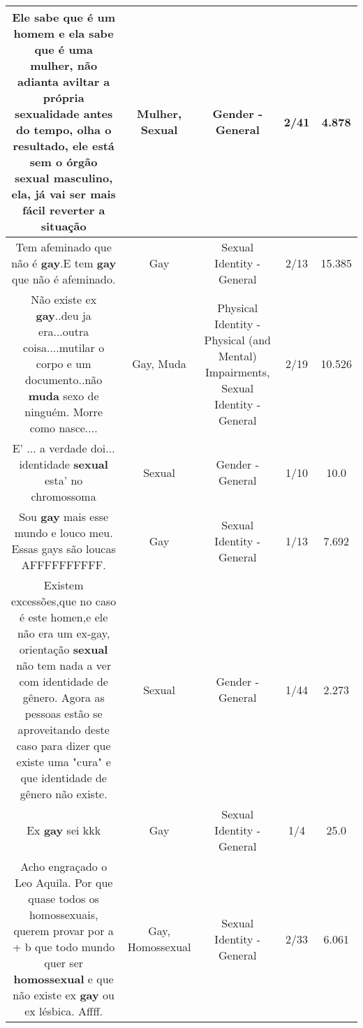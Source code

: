 \documentclass[11pt]{article}
\newlength\mylength
\begin{document}
\begin{center}
\begin{longtable}{|C{.65\mylength}|C{.30\mylength}|C{.12\mylength}|C{.12\mylength}|C{.12\mylength}|}
  \small Ele sabe que é um homem e ela sabe que é uma \textbf{mulher},  não adianta aviltar a própria sexualidade antes do tempo, olha o resultado,  ele está sem o órgão \textbf{sexual} masculino, ela, já vai ser mais fácil reverter a situação\normalsize   & Mulher, Sexual & Gender - General & 2/41 & 4.878 \\  \hline
  \small Tem afeminado que não é \textbf{gay}.E tem \textbf{gay} que não é afeminado.\normalsize   & Gay & Sexual Identity - General & 2/13 & 15.385 \\  \hline
  \small Não existe ex \textbf{gay}..deu ja era...outra coisa....mutilar o corpo e um documento..não \textbf{muda} sexo de ninguém. Morre como nasce....\normalsize   & Gay, Muda & Physical Identity - Physical (and Mental) Impairments, Sexual Identity - General & 2/19 & 10.526 \\  \hline
  \small E' ... a verdade doi... identidade \textbf{sexual}  esta' no chromossoma\normalsize   & Sexual & Gender - General & 1/10 & 10.0 \\  \hline
  \small Sou \textbf{gay} mais esse mundo e louco meu. Essas gays são loucas AFFFFFFFFFF.\normalsize   & Gay & Sexual Identity - General & 1/13 & 7.692 \\  \hline
  \small Existem excessões,que no caso é este homen,e ele não era um ex-gay, orientação \textbf{sexual} não tem nada a ver com identidade de gênero. Agora as pessoas estão se aproveitando deste caso para dizer que existe uma "cura" e que identidade de gênero não existe.\normalsize   & Sexual & Gender - General & 1/44 & 2.273 \\  \hline
  \small Ex \textbf{gay} sei kkk\normalsize   & Gay & Sexual Identity - General & 1/4 & 25.0 \\  \hline
  \small Acho engraçado o Leo Aquila. Por que quase todos os homossexuais,  querem provar por a + b que todo mundo quer ser \textbf{homossexual} e que não existe ex \textbf{gay} ou ex lésbica. Affff.\normalsize   & Gay, Homossexual & Sexual Identity - General & 2/33 & 6.061 \\  \hline

\end{longtable}
\end{center}
\end{document}
